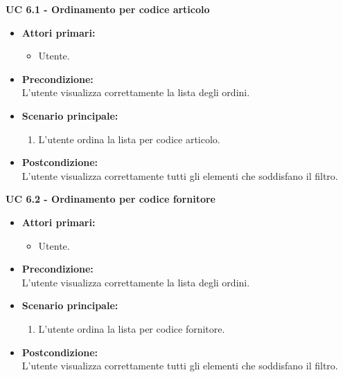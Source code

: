 \noindent \textbf{\large UC 6.1 - Ordinamento per codice articolo }
\label{uc:ordinamento-codice-articolo}
\begin{itemize}

	\item \textbf{Attori primari: }
		\begin{itemize}
			\item Utente.
		\end{itemize}

	\item \textbf{Precondizione: }\\[0.3cm]
		L'utente visualizza correttamente la lista degli ordini.
\item \textbf{Scenario principale: }
		\begin{enumerate}
			\item L'utente ordina la lista per codice articolo.
		\end{enumerate}
		

	\item \textbf{Postcondizione: }\\[0.3cm]
		L'utente visualizza correttamente tutti gli elementi che soddisfano il filtro.

\end{itemize}

\vspace{0.5cm}

\noindent \textbf{\large UC 6.2 - Ordinamento per codice fornitore }
\label{uc:ordinamento-codice-fornitore}
\begin{itemize}

	\item \textbf{Attori primari: }
		\begin{itemize}
			\item Utente.
		\end{itemize}

	\item \textbf{Precondizione: }\\[0.3cm]
		L'utente visualizza correttamente la lista degli ordini.

	\item \textbf{Scenario principale: }
		\begin{enumerate}
			\item L'utente ordina la lista per codice fornitore.
		\end{enumerate}
		

	\item \textbf{Postcondizione: }\\[0.3cm]
		L'utente visualizza correttamente tutti gli elementi che soddisfano il filtro.

\end{itemize}


